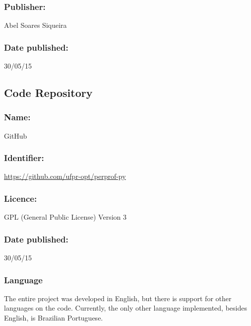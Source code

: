     \subsubsection*{Publisher:} Abel Soares Siqueira

    \subsubsection*{Date published:} 30/05/15

\subsection*{Code Repository}

    \subsubsection*{Name:} GitHub

    \subsubsection*{Identifier:} \url{https://github.com/ufpr-opt/perprof-py}

    \subsubsection*{Licence:} GPL (General Public License) Version 3

    \subsubsection*{Date published:} 30/05/15

\subsubsection*{Language}

    The entire project was developed in English, but there is support for
    other languages on the code. Currently, the only other language implemented, besides English, is Brazilian Portuguese.

